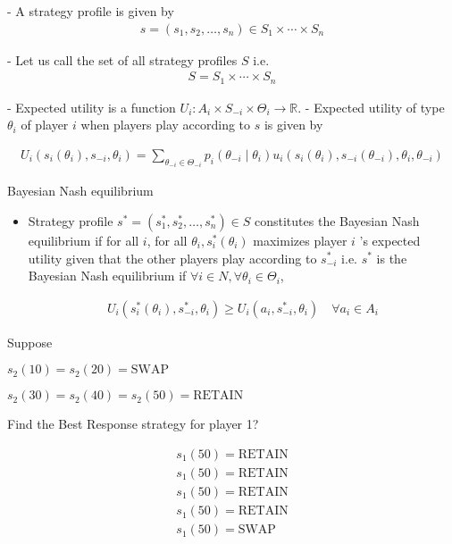 \documentclass[12pt,a4paper]{article}
\begin{document}
- A strategy profile is given by
\begin{align*}
s=\left(s_1, s_2, \ldots, s_n\right) \in S_1 \times \cdots \times S_n
\end{align*}

- Let us call the set of all strategy profiles \(S\) i.e.
\begin{align*}
S=S_1 \times \cdots \times S_n
\end{align*}

- Expected utility is a function \(U_i: A_{i} \times S_{-i} \times \Theta_i \rightarrow \mathbb{R}\).
- Expected utility of type \(\theta_i\) of player \(i\) when players play according to \(s\) is given by

\begin{align*}
U_i\left(s_i\left(\theta_i\right), s_{-i}, \theta_i\right)=\sum_{\theta_{-i} \in \Theta_{-i}} p_i\left(\theta_{-i} \mid \theta_i\right) u_i\left(s_i\left(\theta_i\right), s_{-i}\left(\theta_{-i}\right), \theta_i, \theta_{-i}\right)
\end{align*}
\pagebreak

Bayesian Nash equilibrium
\begin{itemize}
\item Strategy profile \(s^*=\left(s_1^*, s_2^*, \ldots, s_n^*\right) \in S\) constitutes the Bayesian Nash equilibrium if for all \(i\), for all \(\theta_i, s_i^*\left(\theta_i\right)\) maximizes player \(i\) 's expected utility given that the other players play according to \(s_{-i}^*\) i.e. \(s^*\) is the Bayesian Nash equilibrium if \(\forall i \in N, \forall \theta_i \in \Theta_i\),

\begin{align*}
U_i\left(s_i^*\left(\theta_i\right), s_{-i}^*, \theta_i\right) \geq U_i\left(a_i, s_{-i}^*, \theta_i\right) \quad \forall a_i \in A_i
\end{align*}
\end{itemize}

Suppose 

\(s_{2}(10)=s_{2}(20)=\text{SWAP}\)  

\(s_{2}(30)=s_{2}(40)=s_{2}(50)=\text{RETAIN}\)  

Find the Best Response strategy for player 1?

 \begin{align*}
    s_{1}(50)=\text{RETAIN}\\
    s_{1}(50)=\text{RETAIN}\\
    s_{1}(50)=\text{RETAIN}\\
    s_{1}(50)=\text{RETAIN}\\
    s_{1}(50)=\text{SWAP}\\
\end{align*}
\end{document}
